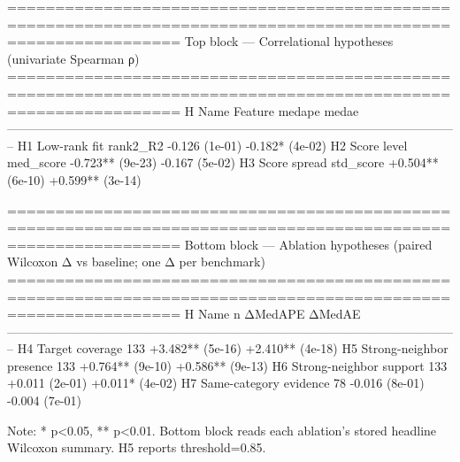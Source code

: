 ==============================================================================================================
Top block — Correlational hypotheses (univariate Spearman ρ)
==============================================================================================================
H    Name                         Feature                       medape             medae
--------------------------------------------------------------------------------------------------------------
H1   Low-rank fit                 rank2_R2              -0.126 (1e-01)   -0.182* (4e-02)
H2   Score level                  med_score           -0.723** (9e-23)    -0.167 (5e-02)
H3   Score spread                 std_score           +0.504** (6e-10)  +0.599** (3e-14)

==============================================================================================================
Bottom block — Ablation hypotheses (paired Wilcoxon Δ vs baseline; one Δ per benchmark)
==============================================================================================================
H    Name                            n           ΔMedAPE            ΔMedAE
--------------------------------------------------------------------------------------------------------------
H4   Target coverage               133  +3.482** (5e-16)  +2.410** (4e-18)
H5   Strong-neighbor presence      133  +0.764** (9e-10)  +0.586** (9e-13)
H6   Strong-neighbor support       133    +0.011 (2e-01)   +0.011* (4e-02)
H7   Same-category evidence         78    -0.016 (8e-01)    -0.004 (7e-01)

Note: * p<0.05, ** p<0.01.  Bottom block reads each ablation's stored headline Wilcoxon summary. H5 reports threshold=0.85.
